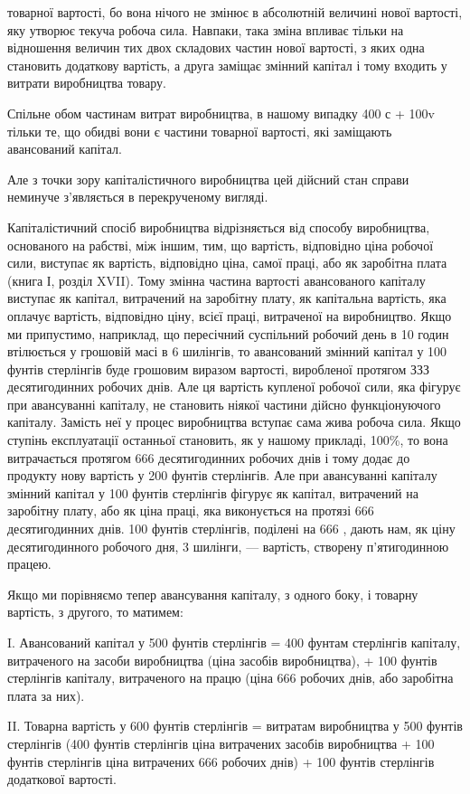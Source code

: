 \parcont{}  %
товарної вартості, бо вона нічого не змінює в абсолютній величині
нової вартості, яку утворює текуча робоча сила. Навпаки,
така зміна впливає тільки на відношення величин тих двох складових
частин нової вартості, з яких одна становить додаткову
вартість, а друга заміщає змінний капітал і тому входить у витрати
виробництва товару.

Спільне обом частинам витрат виробництва, в нашому випадку
400 с + 100v тільки те, що обидві вони є частини товарної
вартості, які заміщають авансований капітал.

Але з точки зору капіталістичного виробництва цей дійсний
стан справи неминуче з’являється в перекрученому вигляді.

Капіталістичний спосіб виробництва відрізняється від способу
виробництва, основаного на рабстві, між іншим, тим, що
вартість, відповідно ціна робочої сили, виступає як вартість,
відповідно ціна, самої праці, або як заробітна плата (книга І,
розділ XVII). Тому змінна частина вартості авансованого капіталу
виступає як капітал, витрачений на заробітну плату,
як капітальна вартість, яка оплачує вартість, відповідно ціну,
всієї праці, витраченої на виробництво. Якщо ми припустимо,
наприклад, що пересічний суспільний робочий день в 10 годин
втілюється у грошовій масі в 6 шилінгів, то авансований
змінний капітал у 100 фунтів стерлінгів буде грошовим
виразом вартості, виробленої протягом ЗЗЗ  десятигодинних
робочих днів. Але ця вартість купленої робочої сили, яка фігурує
при авансуванні капіталу, не становить ніякої частини
дійсно функціонуючого капіталу. Замість неї у процес виробництва
вступає сама жива робоча сила. Якщо ступінь експлуатації
останньої становить, як у нашому прикладі, 100\%, то вона
витрачається протягом 666 десятигодинних робочих днів і тому
додає до продукту нову вартість у 200 фунтів стерлінгів. Але
при авансуванні капіталу змінний капітал у 100 фунтів стерлінгів
фігурує як капітал, витрачений на заробітну плату, або як
ціна праці, яка виконується на протязі 666  десятигодинних
днів. 100 фунтів стерлінгів, поділені на 666 , дають нам, як
ціну десятигодинного робочого дня, 3 шилінги, — вартість, створену
п’ятигодинною працею.

Якщо ми порівняємо тепер авансування капіталу, з одного
боку, і товарну вартість, з другого, то матимем:

I. Авансований капітал у 500 фунтів стерлінгів = 400 фунтам
стерлінгів капіталу, витраченого на засоби виробництва
(ціна засобів виробництва), + 100 фунтів стерлінгів капіталу,
витраченого на працю (ціна 666  робочих днів, або заробітна
плата за них).

II. Товарна вартість у 600 фунтів стерлінгів = витратам виробництва
у 500 фунтів стерлінгів (400 фунтів стерлінгів
ціна витрачених засобів виробництва + 100 фунтів стерлінгів
ціна витрачених 666  робочих днів) + 100 фунтів
стерлінгів додаткової вартості.
